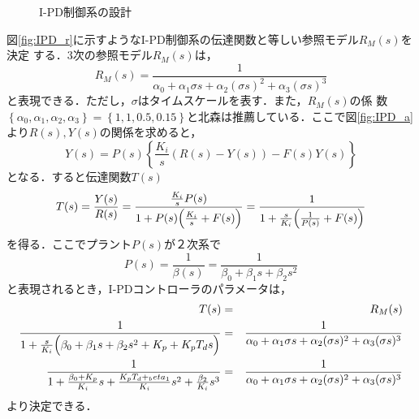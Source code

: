 \documentclass[a4paper,12pt]{jarticle}
\begin{document}
\begin{figure}[tbp]
  \begin{center} 
  \hfill
  \end{center}
  \caption{I-PD制御系の設計}
  \label{fig:IPD}
\end{figure}
%
図\ref{fig:IPD_r}に示すようなI-PD制御系の伝達関数と等しい参照モデル$R_M(s)$を決定
する．3次の参照モデル$R_M(s)$は，
%
\begin{equation}\label{equ:R_M}
 R_M(s) = \frac{1}{\alpha_0+\alpha_1\sigma s+\alpha_2 (\sigma s)^2+\alpha_3(\sigma s)^3}
\end{equation}
%
と表現できる．ただし，$\sigma$はタイムスケールを表す．また，$R_M(s)$の係
数
$\left\{\alpha_0,\alpha_1,\alpha_2,\alpha_3\right\}=\left\{1,1,0.5,0.15\right\}$と北森は推薦している\cite{kitamori}．ここで図\ref{fig:IPD_a}より$R(s),Y(s)$の関係を求めると，
%
\begin{equation}
 Y(s) = P(s)\left\{\frac{K_i}{s}(R(s)-Y(s))-F(s)Y(s) \right\}
\end{equation}
%
となる．すると伝達関数$T(s)$
%
\begin{equation}
 T(s) = \frac{Y(s)}{R(s)} =
  \frac{\frac{K_i}{s}P(s)}{1+P(s)\Bigl(\frac{K_i}{s}+F(s)\Bigr)} =  \frac{1}{1+\frac{s}{K_i}\Bigl(\frac{1}{P(s)}+F(s)\Bigr)}
\end{equation}
%
を得る．ここでプラント$P(s)$が２次系で
%
\begin{equation}\label{equ:beta}
 P(s) = \frac{1}{\beta (s)} = \frac{1}{\beta_0 + \beta_1 s + \beta_2 s^2}
\end{equation}
%
と表現されるとき，I-PDコントローラのパラメータは，
%
\begin{eqnarray}
 T(s) & = & R_M(s) \nonumber \\
 \frac{1}{1+\frac{s}{K_i}\Bigl(\beta_0 + \beta_1 s + \beta_2 s^2 +
  K_p+K_p T_d s \Bigr)} & = & \frac{1}{\alpha_0+\alpha_1\sigma
  s+\alpha_2 (\sigma s)^2+\alpha_3(\sigma s)^3} \nonumber \\
 \frac{1}{1+\frac{\beta_0 + K_p}{K_i}s+\frac{K_pT_d+_beta_1}{K_i}s^2+\frac{\beta_2}{K_i}s^3}& = & \frac{1}{\alpha_0+\alpha_1\sigma s+\alpha_2 (\sigma s)^2+\alpha_3(\sigma s)^3}\label{equ:equal}
\end{eqnarray}
%
より決定できる．
%
\end{document}
